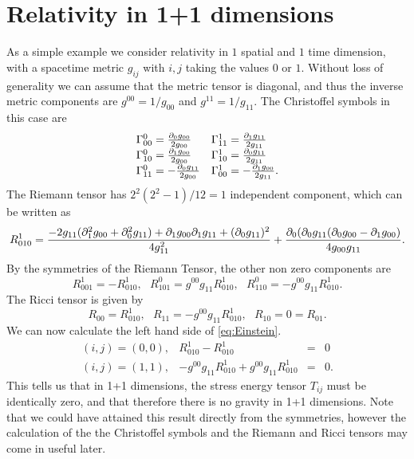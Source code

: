 \section{Relativity in 1+1 dimensions}
As a simple example we consider relativity in $1$ spatial and $1$ time dimension, with a spacetime metric $g_{ij}$ with $i,j$ taking the values $0$ or $1$. Without loss of generality we can assume that the metric tensor is diagonal, and thus the inverse metric components are $g^{00}=1/g_{00}$ and $g^{11}=1/g_{11}$. The Christoffel symbols in this case are
\begin{equation}
\begin{array}{ll}
\Gamma^0_{00}= \frac{{\partial}_0 g_{00}}{2 g_{00}} & \Gamma^1_{11}= \frac{{\partial}_1 g_{11}}{2 g_{11}} \\
\Gamma^0_{10}= \frac{{\partial}_1 g_{00}}{2 g_{00}} & \Gamma^1_{10}= \frac{{\partial}_0 g_{11}}{2 g_{11}}\\
\Gamma^0_{11}= -\frac{{\partial}_0 g_{11}}{2 g_{00}} & \Gamma^1_{00}= -\frac{{\partial}_1 g_{00}}{2 g_{11}}.
\end{array}
\end{equation}
The Riemann tensor has $2^2(2^2-1)/12 =1$ independent component, which can be written as 
\begin{equation}\label{eq:Riemann1plus1}
R^1_{010}=\frac{-2g_{11}({\partial}_1^2 g_{00} + {\partial}_0^2 g_{11}) + {\partial}_1 g_{00} {\partial}_1 g_{11} + ({\partial}_0 g_{11})^2}{4g_{11}^2}+\frac{{\partial}_0({\partial}_0 g_{11}({\partial}_0 g_{00} - {\partial}_1 g_{00})}{4g_{00}g_{11}}.
\end{equation}
By the symmetries of the Riemann Tensor, the other non zero components are
\begin{equation}
R^1_{001}=-R^1_{010}, \mbox{ } R^0_{101}=g^{00}g_{11}R^1_{010}, \mbox{ } R^0_{110}=-g^{00}g_{11}R^1_{010}.
\end{equation}
The Ricci tensor is given by
\begin{equation}
R_{00} = R^1_{010}, \mbox{ } R_{11}=-g^{00}g_{11}R^1_{010},\mbox{ } R_{10} = 0 = R_{01}.
\end{equation}
We can now calculate the left hand side of \ref{eq:Einstein}.
\begin{equation}
\begin{array}{lrcl}
(i,j)=(0,0), & R^1_{010}-R^1_{010} & = & 0 \\
(i,j)=(1,1), & -g^{00}g_{11}R^1_{010}+g^{00}g_{11}R^1_{010} & = & 0.
\end{array}
\end{equation}
This tells us that in 1+1 dimensions, the stress energy tensor $T_{ij}$ must be identically zero, and that therefore there is no gravity in 1+1 dimensions. Note that we could have attained this result directly from the symmetries, however the calculation of the the Christoffel symbols and the Riemann and Ricci tensors may come in useful later.

